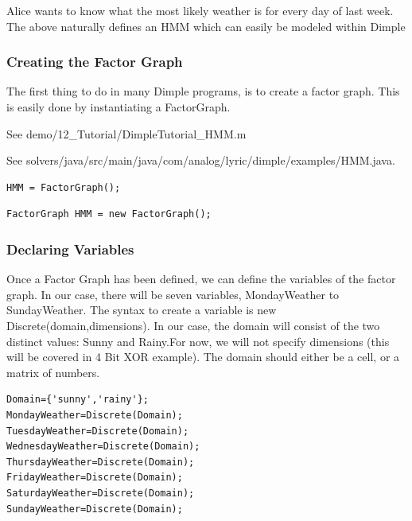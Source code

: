 Alice wants to know what the most likely weather is for every day of last week. The above naturally defines an HMM which can easily be modeled within Dimple



\subsubsection*{Creating the Factor Graph}
The first thing to do in many Dimple programs, is to create a factor graph. This is easily done by instantiating a FactorGraph. 

\ifmatlab

See \/demo/12\_Tutorial/DimpleTutorial\_HMM.m

\fi

\ifjava

See solvers/java/src/main/java/com/analog/lyric/dimple/examples/HMM.java.

\fi


\ifmatlab

\begin{lstlisting}
HMM = FactorGraph();
\end{lstlisting}

\fi


\ifjava

\begin{lstlisting}
FactorGraph HMM = new FactorGraph();
\end{lstlisting}

\fi

\subsubsection*{Declaring Variables}
Once a Factor Graph has been defined, we can define the variables of the factor graph.  In our case, there will be seven variables, MondayWeather to SundayWeather. The syntax to create a variable is  \ifjava new \fi Discrete(domain,dimensions). In our case, the domain will consist of the two distinct values: Sunny and Rainy.\ifmatlab For now, we will not specify dimensions (this will be covered in 4 Bit XOR example). The domain should either be a cell, or a matrix of numbers.\fi

\ifmatlab

\begin{lstlisting}
Domain={'sunny','rainy'};
MondayWeather=Discrete(Domain);
TuesdayWeather=Discrete(Domain);
WednesdayWeather=Discrete(Domain);
ThursdayWeather=Discrete(Domain);
FridayWeather=Discrete(Domain);
SaturdayWeather=Discrete(Domain);
SundayWeather=Discrete(Domain);
\end{lstlisting}

